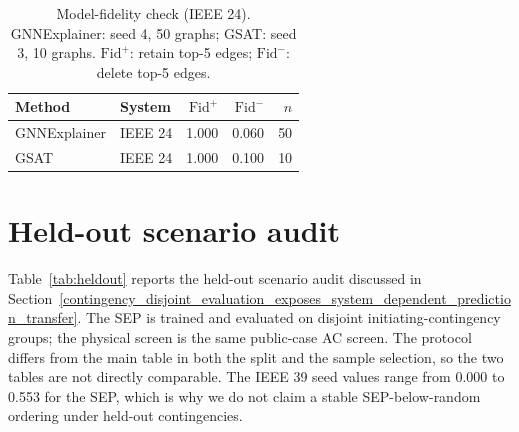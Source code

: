 \begin{table}[h]
\centering
\caption{Model-fidelity check (IEEE 24). GNNExplainer: seed 4, 50 graphs; GSAT: seed 3, 10 graphs. $\mathrm{Fid}^{+}$: retain top-5 edges; $\mathrm{Fid}^{-}$: delete top-5 edges.}
\label{tab:fidelity}
\scriptsize
\begin{tabular}{llrrr}
\toprule
Method & System & $\mathrm{Fid}^{+}$ & $\mathrm{Fid}^{-}$ & $n$ \\
\midrule
GNNExplainer & IEEE 24 & 1.000 & 0.060 & 50 \\
GSAT & IEEE 24 & 1.000 & 0.100 & 10 \\
\bottomrule
\end{tabular}
\end{table}

\section{Held-out scenario audit}\label{appendix:heldout}
\setcounter{table}{0}

Table~\ref{tab:heldout} reports the held-out scenario audit discussed in Section~\ref{contingency_disjoint_evaluation_exposes_system_dependent_prediction_transfer}. The SEP is trained and evaluated on disjoint initiating-contingency groups; the physical screen is the same public-case AC screen. The protocol differs from the main table in both the split and the sample selection, so the two tables are not directly comparable. The IEEE 39 seed values range from 0.000 to 0.553 for the SEP, which is why we do not claim a stable SEP-below-random ordering under held-out contingencies.

\begin{table}[!htbp]
\centering
\caption{Held-out scenario audit for the SEP. Values are mean $\pm$ SD over seeds 2--6; each seed trains and evaluates on disjoint initiating-contingency groups. $n$ varies for IEEE 39 because whole contingency groups are kept intact. This is a sensitivity analysis, not the main public-case table.}
\label{tab:heldout}
\scriptsize
{}
\end{table}

